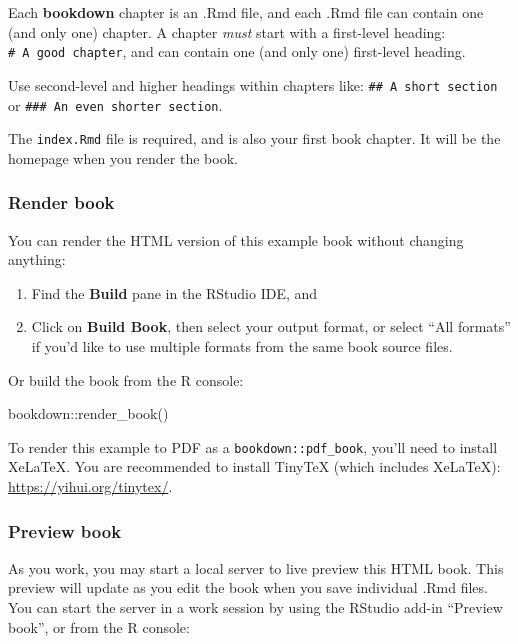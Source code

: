 \documentclass[
]{bxjsbook}
\newenvironment{Shaded}{\begin{snugshade}}{\end{snugshade}}
\newcommand{\FunctionTok}[1]{\textcolor[rgb]{0.00,0.00,0.00}{#1}}
\newcommand{\NormalTok}[1]{#1}
\newcommand{\SpecialCharTok}[1]{\textcolor[rgb]{0.00,0.00,0.00}{#1}}
\theoremstyle{definition}
\theoremstyle{definition}
\theoremstyle{definition}
\theoremstyle{definition}
\theoremstyle{remark}
\begin{document}
Each \textbf{bookdown} chapter is an .Rmd file, and each .Rmd file can contain one (and only one) chapter. A chapter \emph{must} start with a first-level heading: \texttt{\#\ A\ good\ chapter}, and can contain one (and only one) first-level heading.

Use second-level and higher headings within chapters like: \texttt{\#\#\ A\ short\ section} or \texttt{\#\#\#\ An\ even\ shorter\ section}.

The \texttt{index.Rmd} file is required, and is also your first book chapter. It will be the homepage when you render the book.

\hypertarget{render-book}{%
\subsubsection{Render book}\label{render-book}}

You can render the HTML version of this example book without changing anything:

\begin{enumerate}
\def\labelenumi{\arabic{enumi}.}
\item
  Find the \textbf{Build} pane in the RStudio IDE, and
\item
  Click on \textbf{Build Book}, then select your output format, or select ``All formats'' if you'd like to use multiple formats from the same book source files.
\end{enumerate}

Or build the book from the R console:

\begin{Shaded}
\begin{Highlighting}[]
\NormalTok{bookdown}\SpecialCharTok{::}\FunctionTok{render\_book}\NormalTok{()}
\end{Highlighting}
\end{Shaded}

To render this example to PDF as a \texttt{bookdown::pdf\_book}, you'll need to install XeLaTeX. You are recommended to install TinyTeX (which includes XeLaTeX): \url{https://yihui.org/tinytex/}.

\hypertarget{preview-book}{%
\subsubsection{Preview book}\label{preview-book}}

As you work, you may start a local server to live preview this HTML book. This preview will update as you edit the book when you save individual .Rmd files. You can start the server in a work session by using the RStudio add-in ``Preview book'', or from the R console:
\end{document}
